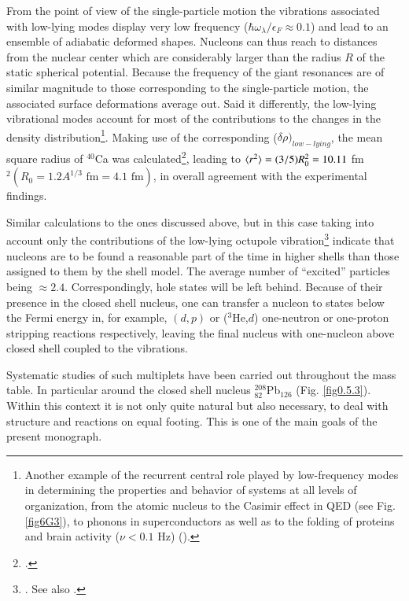 From the point of view of the single-particle motion the vibrations associated with low-lying modes display very low frequency ($\hbar\omega_\lambda/\epsilon_F\approx0.1$) and lead to an ensemble of adiabatic deformed shapes. Nucleons can thus reach to distances from the nuclear center which are considerably larger than the radius $R$ of the static spherical potential. Because the frequency of the giant resonances are of similar magnitude to those corresponding to the single-particle motion, the associated surface deformations average out. 
Said it differently,  the low-lying vibrational modes  account for most of the contributions to the changes in the density distribution\footnote{\label{f52C1} Another example of the  recurrent central role played by low-frequency modes in determining the properties and behavior of systems at all levels of organization, from the atomic nucleus to the Casimir effect in QED (see Fig. \ref{fig6G3}), to phonons in superconductors as well as  to the folding of proteins and brain  activity ($\nu<0.1$ Hz) (\cite{Mitra:18,Vyazovskiy:13}).}. Making use of the corresponding ($\delta\rho)_{low-lying}$, the mean square radius of $^{40}$Ca was calculated\footnote{\cite{Barranco:87a}.}, leading to $\langle {r^2} \rangle=(3/5)R_0^2=10.11$ fm$^2 (R_0=1.2A^{1/3}\text{ fm}=4.1\text{ fm})$, in overall agreement with the experimental findings. 

Similar calculations to the ones discussed above, but in this case taking into account only the contributions of the low-lying octupole vibration\footnote{\cite{Brown:63}. See also \cite{Anderson:62}.} indicate that nucleons are to be found a reasonable part of the time in higher shells than those assigned to them by the shell model. The average number of ``excited'' particles being $\approx2.4$. 
Correspondingly, hole states will be left behind. Because of their presence  in the closed shell nucleus, one can transfer a nucleon to states below the Fermi energy in, for example, $(d,p)$ or ($^3$He,$d$) one-neutron or one-proton stripping reactions respectively, leaving the final nucleus with one-nucleon above closed shell coupled to the vibrations.


Systematic studies of such multiplets have been carried out throughout the mass table. In particular around the closed shell nucleus $^{208}_{82}$Pb$_{126}$ (Fig. \ref{fig0.5.3}). Within this context it is not only  quite natural but also necessary, to deal with structure and reactions on equal footing.  This is one of the main goals of the present monograph. 
